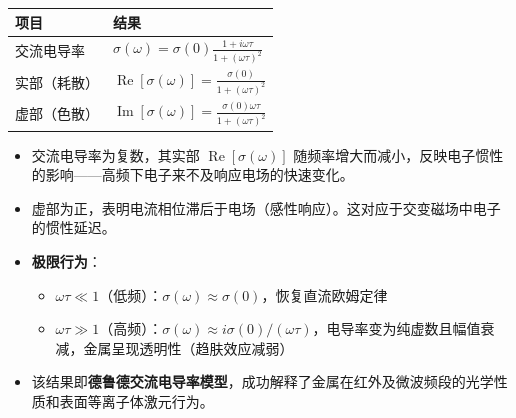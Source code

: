 \begin{formulabox}[答案汇总]
\begin{center}
\begin{tabular}{ll}
\toprule
\textbf{项目} & \textbf{结果} \\
\midrule
交流电导率 & $\displaystyle\sigma(\omega)=\sigma(0)\frac{1+i\omega\tau}{1+(\omega\tau)^2}$ \\
实部（耗散） & $\displaystyle\operatorname{Re}[\sigma(\omega)]=\frac{\sigma(0)}{1+(\omega\tau)^2}$ \\
虚部（色散） & $\displaystyle\operatorname{Im}[\sigma(\omega)]=\frac{\sigma(0)\omega\tau}{1+(\omega\tau)^2}$ \\
\bottomrule
\end{tabular}
\end{center}
\end{formulabox}

\begin{insightbox}[物理图像]
\begin{itemize}
    \item 交流电导率为复数，其实部 $\operatorname{Re}[\sigma(\omega)]$ 随频率增大而减小，反映电子惯性的影响——高频下电子来不及响应电场的快速变化。
    \item 虚部为正，表明电流相位滞后于电场（感性响应）。这对应于交变磁场中电子的惯性延迟。
    \item \textbf{极限行为}：
    \begin{itemize}
        \item $\omega\tau\ll1$（低频）：$\sigma(\omega)\approx\sigma(0)$，恢复直流欧姆定律
        \item $\omega\tau\gg1$（高频）：$\sigma(\omega)\approx i\sigma(0)/(\omega\tau)$，电导率变为纯虚数且幅值衰减，金属呈现透明性（趋肤效应减弱）
    \end{itemize}
    \item 该结果即\textbf{德鲁德交流电导率模型}，成功解释了金属在红外及微波频段的光学性质和表面等离子体激元行为。
\end{itemize}
\end{insightbox}
